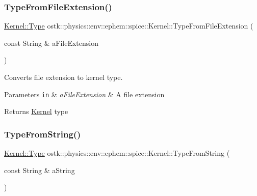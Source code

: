 \subsubsection{\texorpdfstring{Type\+From\+File\+Extension()}{TypeFromFileExtension()}}
{\footnotesize\ttfamily \hyperlink{classostk_1_1physics_1_1env_1_1ephem_1_1spice_1_1_kernel_a76d560bbface15a0cb24cd82e9a93d77}{Kernel\+::\+Type} ostk\+::physics\+::env\+::ephem\+::spice\+::\+Kernel\+::\+Type\+From\+File\+Extension (\begin{DoxyParamCaption}\item[{const String \&}]{a\+File\+Extension }\end{DoxyParamCaption})\hspace{0.3cm}{\ttfamily [static]}}



Converts file extension to kernel type. 


\begin{DoxyParams}[1]{Parameters}
\mbox{\tt in}  & {\em a\+File\+Extension} & A file extension \\
\hline
\end{DoxyParams}
\begin{DoxyReturn}{Returns}
\hyperlink{classostk_1_1physics_1_1env_1_1ephem_1_1spice_1_1_kernel}{Kernel} type 
\end{DoxyReturn}
\mbox{\label{classostk_1_1physics_1_1env_1_1ephem_1_1spice_1_1_kernel_a95148b8d8a008742cb09c7c5fddde8f8}} 
\subsubsection{\texorpdfstring{Type\+From\+String()}{TypeFromString()}}
{\footnotesize\ttfamily \hyperlink{classostk_1_1physics_1_1env_1_1ephem_1_1spice_1_1_kernel_a76d560bbface15a0cb24cd82e9a93d77}{Kernel\+::\+Type} ostk\+::physics\+::env\+::ephem\+::spice\+::\+Kernel\+::\+Type\+From\+String (\begin{DoxyParamCaption}\item[{const String \&}]{a\+String }\end{DoxyParamCaption})\hspace{0.3cm}{\ttfamily [static]}}



